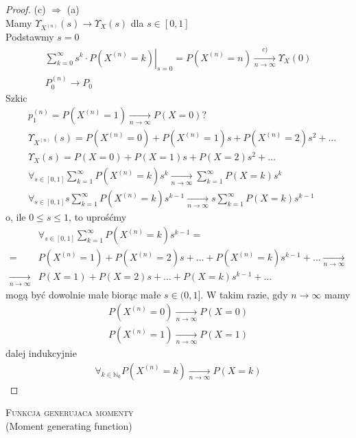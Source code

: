 \begin{proof}
(c) $ \Rightarrow $ (a)\\
Mamy $ \Upsilon_{X^{(n)}}(s)\to\Upsilon_X(s) $ dla $ s\in[0,1] $\\
Podstawmy $ s=0 $
\begin{gather*}
\left.\sum_{k=0}^{\infty }s^k\cdot P\left(X^{(n)}=k\right)\right|_{s=0}=P\left(X^{(n)}=n\right)\xrightarrow[n\to \infty ]{c)}\Upsilon_X(0)\\
P_0^{(n)}\to P_0
\end{gather*}
Szkic
\begin{align*}
&p_1^{(n)}=P\left(X^{(n)}=1\right)\xrightarrow[n\to \infty ]{}P\left(X=0\right)?\\
&\Upsilon_{X^{(n)}}(s)=P\left(X^{(n)}=0\right)+P\left(X^{(n)}=1\right)s+P\left(X^{(n)}=2\right)s^2+\dots\\
&\Upsilon_{X}(s)=P\left(X=0\right)+P\left(X=1\right)s+P\left(X=2\right)s^2+\dots\\
&\forall_{s\in[0,1]}\sum_{k=1}^{\infty }P\left(X^{(n)}=k\right)s^k\xrightarrow[n\to \infty ]{}\sum_{k=1}^{\infty }P\left(X=k\right)s^k\\
&\forall_{s\in[0,1]}s\sum_{k=1}^{\infty }P\left(X^{(n)}=k\right)s^{k-1}\xrightarrow[n\to \infty ]{}s\sum_{k=1}^{\infty }P\left(X=k\right)s^{k-1}
\end{align*}
o, ile $ 0\le s\le1 $, to uprośćmy
\begin{align*}
&\forall_{s\in[0,1]}\sum_{k=1}^{\infty }P\left(X^{(n)}=k\right)s^{k-1}
=\\=&
P\left(X^{(n)}=1\right)+P\left(X^{(n)}=2\right)s+\dots+P\left(X^{(n)}=k\right)s^{k-1}+\dots 
\xrightarrow[n\to \infty ]{}\\
\xrightarrow[n\to \infty ]{}&
P\left(X=1\right)+P\left(X=2\right)s+\dots+P\left(X=k\right)s^{k-1}+\dots 
\end{align*}
mogą być dowolnie małe biorąc małe $ s\in (0,1] $. W takim razie, gdy $ n\to \infty  $ mamy
\begin{gather*}
P\left(X^{(n)}=0\right)\xrightarrow[n\to \infty ]{}P\left(X=0\right)\\
P\left(X^{(n)}=1\right)\xrightarrow[n\to \infty ]{}P\left(X=1\right)
\end{gather*}
dalej indukcyjnie
\begin{gather*}
\forall_{k\in \mathbb N _0}P\left(X^{(n)}=k\right)\xrightarrow[n\to \infty ]{}P\left(X=k\right)
\end{gather*}
\end{proof}
\begin{center}
\textsc{Funkcja generujaca momenty}\\
(Moment generating function)
\end{center}
